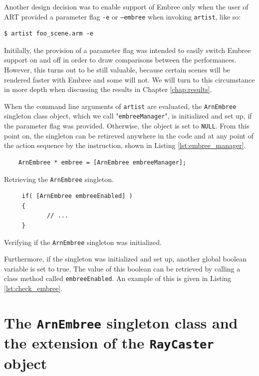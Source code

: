 Another design decision was to enable support of Embree only when the user of ART provided a parameter flag \texttt{-e} or \texttt{--embree} when invoking \texttt{artist}, like so:

\begin{Verbatim}
$ artist foo_scene.arm -e
\end{Verbatim}

Initilally, the provision of a parameter flag was intended to easily switch Embree support on and off in order to draw comparisons between the performances. However, this turns out to be still valuable, because certain scenes will be rendered faster with Embree and some will not. We will turn to this circumstance in more depth when discussing the results in Chapter \ref{chap:results}. 

When the command line arguments of \texttt{artist} are evaluated, the \texttt{ArnEmbree} singleton class object, which we call "\texttt{embreeManager}", is initialized and set up, if the parameter flag was provided. Otherwise, the object is set to \texttt{NULL}. From this point on, the  singleton can be retireved anywhere in the code and at any point of the action sequence by the instruction, shown in Listing \ref{lst:embree_manager}.

\begin{listing} 
	\begin{lstlisting}
	ArnEmbree * embree = [ArnEmbree embreeManager];
	\end{lstlisting}
	\caption{Retrieving the \texttt{ArnEmbree} singleton.}
	\label{lst:embree_manager}
\end{listing}


\begin{listing}
	\begin{lstlisting}
	 if( [ArnEmbree embreeEnabled] ) 
	 {
	 		// ...
	 }
	\end{lstlisting}
	\caption{Verifying if the \texttt{ArnEmbree} singleton was initialized.}
	\label{lst:check_embree}
\end{listing}

Furthermore, if the singleton was initialized and set up, another global boolean variable is set to true. The value of this boolean can be retrieved by calling a class method called \texttt{embreeEnabled}. An example of this is given in Listing \ref{lst:check_embree}.

\section{The \texttt{ArnEmbree} singleton class and the extension of the \texttt{RayCaster} object}

